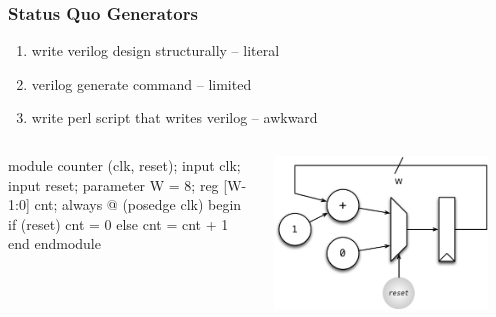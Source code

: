 \documentclass[xcolor=pdflatex,dvipsnames,table]{beamer}
\begin{document}
\begin{frame}[fragile]
\frametitle{Status Quo Generators}
\begin{enumerate}
\item write verilog design structurally -- literal
\item verilog generate command -- limited
\item write perl script that writes verilog -- awkward
\end{enumerate}
\begin{columns}
\begin{scala}
module counter (clk, reset);
  input clk;
  input reset;
  parameter W = 8;
  reg [W-1:0] cnt;
  always @ (posedge clk)
  begin
    if (reset)
      cnt = 0
    else
      cnt = cnt + 1
  end
endmodule
\end{scala}
\begin{center}
\includegraphics[width=0.9\textwidth]{figs/counter-width.pdf}
\end{center}
\end{columns}
\end{frame}
\end{document}
